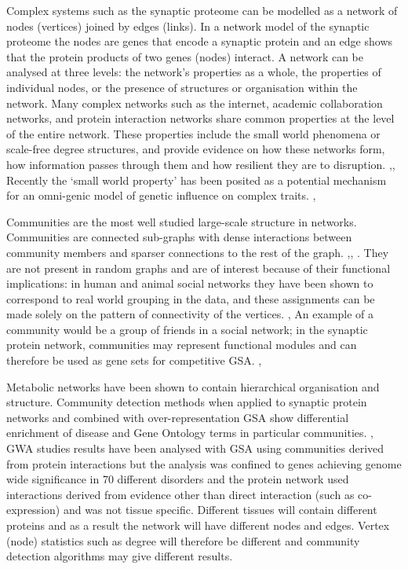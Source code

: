 Complex systems such as the synaptic proteome can be modelled as a network of nodes (vertices) joined by edges (links). In a network model of the synaptic proteome the nodes are genes that encode a synaptic protein and an edge shows that the protein products of two genes (nodes) interact. A network can be analysed at three levels: the network’s properties as a whole, the properties of individual nodes, or the presence of structures or organisation within the network.  \cite{newman2012communities}   
Many complex networks such as the internet, academic collaboration networks, and protein interaction networks share common properties at the level of the entire network. These properties include the small world phenomena or scale-free degree structures\cite{barabasi1999emergence},\cite{watts1998collective}  and provide evidence on how these networks form, how information passes through them and how resilient they are to disruption. \cite{rosvall2008maps},\cite{albert2000error},\cite{bianconi2001competition}  Recently the ‘small world property’ has been posited as a potential mechanism for an omni-genic model of genetic influence on complex traits. \cite{watts1998collective},\cite{boyle2017expanded} 


Communities  are the most well studied large-scale structure in networks. \cite{newman2012communities}  Communities are connected sub-graphs with dense interactions between community members and sparser connections to the rest of the graph. \cite{newman2012communities},\cite{fortunato2016community},\cite{girvan2002community} . They are not present in random graphs and are of interest because of their functional implications: in human and animal social networks they have been shown to correspond to real world grouping in the data, and these assignments can be made solely on the pattern of connectivity of the vertices. \cite{adamic2005political},\cite{zachary1977information}  An example of a community would be a group of friends in a social network; in the synaptic protein network, communities may represent functional modules and can therefore be used as gene sets for competitive GSA.  \cite{pocklington2006proteomes},\cite{mclean2016improved}  

Metabolic networks have been shown to contain hierarchical organisation and structure.\cite{ravasz2002hierarchical} Community detection methods when applied to synaptic protein networks and combined with over-representation GSA show differential enrichment of disease and Gene Ontology terms in particular communities. \cite{pocklington2006proteomes},\cite{mclean2016improved}  GWA studies results have been analysed with GSA using communities derived from protein interactions but the analysis was confined to genes achieving genome wide significance in 70 different disorders and the protein network used interactions derived from evidence other than direct interaction (such as co-expression) and was not tissue specific. \cite{ghiassian2015disease} 
Different tissues will contain different proteins and as a result the network will have different nodes and edges. Vertex (node) statistics such as degree will therefore be different and  community detection algorithms may give different results.

